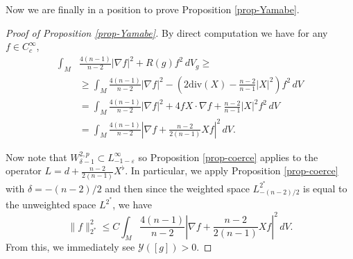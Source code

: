 \documentclass[a4paper,11pt,reqno]{amsart}
\theoremstyle{plain}
\theoremstyle{definition}
\theoremstyle{remark}
\numberwithin{equation}{section}
\begin{document}
Now we are finally in a position to prove Proposition \ref{prop-Yamabe}.

\begin{proof}[Proof of Proposition \ref{prop-Yamabe}]
	By direct computation we have for any $f\in C^\infty_c$,
	\begin{align*}
		\int_M &\frac{4(n-1)}{n-2}|\nabla f|^2+R(g)f^2\,dV_g\geq \\
		 &\geq \int_M \frac{4(n-1)}{n-2}|\nabla f|^2-\left( 2\mathrm{div}(X)-\frac{n-2}{n-1}|X|^2 \right)f^2\,dV\\
	&=\int_M \frac{4(n-1)}{n-2}|\nabla f|^2+4fX\cdot\nabla f+\frac{n-2}{n-1}|X|^2f^2\,dV\\
	&=\int_M \frac{4(n-1)}{n-2}\left|\nabla f +\frac{n-2}{2(n-1)}Xf   \right|^2\,dV.
	\end{align*}

	Now note that $W^{2,p}_{\delta-1}\subset L^\infty_{-1-\varepsilon}$ so Proposition \ref{prop-coerce} applies to the operator $L=d+\frac{n-2}{2(n-1)}X^\flat$. In particular, we apply Proposition \ref{prop-coerce} with $\delta=-(n-2)/2$ and then since the weighted space $L^{2^*}_{-(n-2)/2}$ is equal to the unweighted space $L^{2^*}$, we have
	\begin{equation*}
		\|f\|^2_{2^*}\leq C \int_M \frac{4(n-1)}{n-2}\left|\nabla f +\frac{n-2}{2(n-1)}Xf   \right|^2\,dV.
	\end{equation*}
	From this, we immediately see $\mathcal Y([g])>0$.
	
\end{proof}
\end{document}
